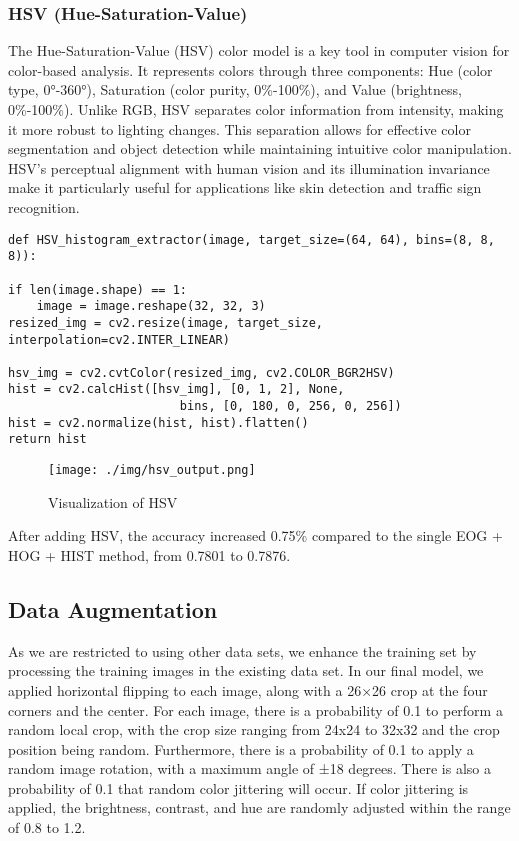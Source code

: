 \documentclass[a4paper,11pt]{article}
\begin{document}
\subsubsection{HSV (Hue-Saturation-Value)}
The Hue-Saturation-Value (HSV) color model is a key tool in computer vision for color-based analysis. It represents colors through three components: Hue (color type, 0°-360°), Saturation (color purity, 0\%-100\%), and Value (brightness, 0\%-100\%). Unlike RGB, HSV separates color information from intensity, making it more robust to lighting changes. This separation allows for effective color segmentation and object detection while maintaining intuitive color manipulation. HSV's perceptual alignment with human vision and its illumination invariance make it particularly useful for applications like skin detection and traffic sign recognition.

\begin{verbatim}
def HSV_histogram_extractor(image, target_size=(64, 64), bins=(8, 8, 8)):

if len(image.shape) == 1:
    image = image.reshape(32, 32, 3) 
resized_img = cv2.resize(image, target_size, interpolation=cv2.INTER_LINEAR)

hsv_img = cv2.cvtColor(resized_img, cv2.COLOR_BGR2HSV)
hist = cv2.calcHist([hsv_img], [0, 1, 2], None,
                        bins, [0, 180, 0, 256, 0, 256])
hist = cv2.normalize(hist, hist).flatten()
return hist
\end{verbatim}

\begin{figure}[H]
    \centering
    \texttt{[image: ./img/hsv\_output.png]}
    \caption[Label count]{Visualization of HSV}
    \label{fig:example}
\end{figure}

After adding HSV, the accuracy increased  0.75\% compared to the single EOG + HOG + HIST method, from 0.7801 to 0.7876.


\subsection{Data Augmentation}
As we are restricted to using other data sets, we enhance the training set by processing the training images in the existing data set. In our final model, we applied horizontal flipping to each image, along with a 26×26 crop at the four corners and the center. For each image, there is a probability of 0.1 to perform a random local crop, with the crop size ranging from 24x24 to 32x32 and the crop position being random. Furthermore, there is a probability of 0.1 to apply a random image rotation, with a maximum angle of ±18 degrees. There is also a probability of 0.1 that random color jittering will occur. If color jittering is applied, the brightness, contrast, and hue are randomly adjusted within the range of 0.8 to 1.2.
\end{document}
